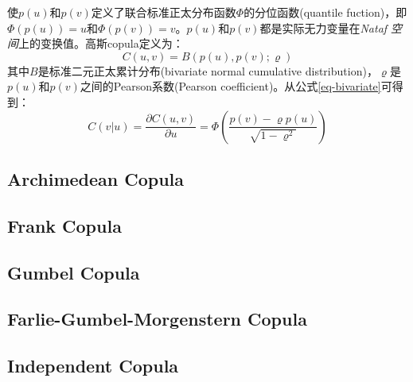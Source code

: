 使$p(u)$和$p(v)$定义了联合标准正太分布函数$\Phi$的\textcolor[rgb]{1,0,0}{分位函数(quantile fuction)}，即$\Phi(p(u)) = u$和$\Phi(p(v))=v$。$p(u)$和$p(v)$都是实际无力变量在\emph{Nataf 空间}上的变换值。高斯copula定义为：
\begin{equation}
    \label{eq-gaussiancopula}
    C(u,v) = B(p(u),p(v);\varrho)
\end{equation}
其中$B$是标准二元正太累计分布(bivariate normal cumulative distribution)，$\varrho$是$p(u)$和$p(v)$之间的Pearson系数(Pearson coefficient)。从公式\ref{eq-bivariate}可得到：
\begin{equation} 
    \label{eq-copula-bivariate}
    C(v|u) = \dfrac{\partial C(u,v)}{\partial u} = \Phi \left(\dfrac{p(v)-\varrho p(u)}{\sqrt{1-\varrho^{2}}}\right)
\end{equation} 


\subsection{Archimedean Copula}
\subsection{Frank Copula}
\subsection{Gumbel Copula}
\subsection{Farlie-Gumbel-Morgenstern  Copula}
\subsection{Independent Copula}
